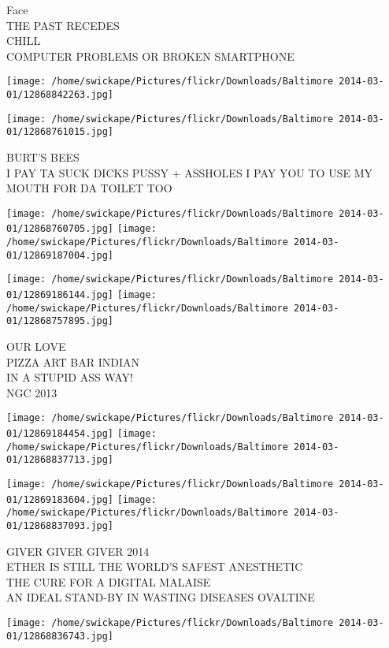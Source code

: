\documentclass[10pt,letterpaper]{article}
\begin{document}
Face\\
THE PAST RECEDES\\
CHILL\\
COMPUTER PROBLEMS OR BROKEN SMARTPHONE\\
\pagebreak

\texttt{[image: /home/swickape/Pictures/flickr/Downloads/Baltimore 2014-03-01/12868842263.jpg]}

\vspace{0.25in}
\texttt{[image: /home/swickape/Pictures/flickr/Downloads/Baltimore 2014-03-01/12868761015.jpg]}

BURT'S BEES\\
I PAY TA SUCK DICKS PUSSY + ASSHOLES I PAY YOU TO USE MY MOUTH FOR DA TOILET TOO\\
\pagebreak

\texttt{[image: /home/swickape/Pictures/flickr/Downloads/Baltimore 2014-03-01/12868760705.jpg]}
\texttt{[image: /home/swickape/Pictures/flickr/Downloads/Baltimore 2014-03-01/12869187004.jpg]}

\texttt{[image: /home/swickape/Pictures/flickr/Downloads/Baltimore 2014-03-01/12869186144.jpg]}
\texttt{[image: /home/swickape/Pictures/flickr/Downloads/Baltimore 2014-03-01/12868757895.jpg]}

OUR LOVE\\
PIZZA ART BAR INDIAN\\
IN A STUPID ASS WAY!\\
NGC 2013\\
\pagebreak

\texttt{[image: /home/swickape/Pictures/flickr/Downloads/Baltimore 2014-03-01/12869184454.jpg]}
\texttt{[image: /home/swickape/Pictures/flickr/Downloads/Baltimore 2014-03-01/12868837713.jpg]}

\texttt{[image: /home/swickape/Pictures/flickr/Downloads/Baltimore 2014-03-01/12869183604.jpg]}
\texttt{[image: /home/swickape/Pictures/flickr/Downloads/Baltimore 2014-03-01/12868837093.jpg]}

GIVER GIVER GIVER 2014\\
ETHER IS STILL THE WORLD'S SAFEST ANESTHETIC\\
THE CURE FOR A DIGITAL MALAISE\\
AN IDEAL STAND{-}BY IN WASTING DISEASES OVALTINE\\
\pagebreak

\texttt{[image: /home/swickape/Pictures/flickr/Downloads/Baltimore 2014-03-01/12868836743.jpg]}
\end{document}
